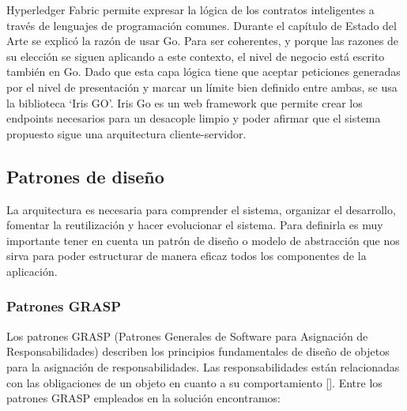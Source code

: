 Hyperledger Fabric permite expresar la lógica de los contratos inteligentes a través de lenguajes de programación comunes. Durante el capítulo de Estado del Arte se explicó la razón de usar Go. Para ser coherentes, y porque las razones de su elección se siguen aplicando a este contexto, el nivel de negocio está escrito también en Go. Dado que esta capa lógica tiene que aceptar peticiones generadas por el nivel de presentación y marcar un límite bien definido entre ambas, se usa la biblioteca `Iris GO'. Iris Go es un web framework que permite crear los endpoints necesarios para un desacople limpio y poder afirmar que el sistema propuesto sigue una arquitectura cliente-servidor.

\subsection{Patrones de diseño}

La arquitectura es necesaria para comprender el sistema, organizar el desarrollo, fomentar la reutilización y hacer evolucionar el sistema. Para definirla es muy importante tener en cuenta un patrón de diseño o modelo de abstracción que nos sirva para poder estructurar de manera eficaz todos los componentes de la aplicación.

\subsubsection{Patrones GRASP}
Los patrones GRASP (Patrones Generales de Software para Asignación de Responsabilidades) describen los principios fundamentales de diseño de objetos para la asignación de responsabilidades. Las responsabilidades  están relacionadas con las obligaciones de un objeto en cuanto a su comportamiento [\cite{97}]. Entre los patrones GRASP empleados en la solución encontramos:

